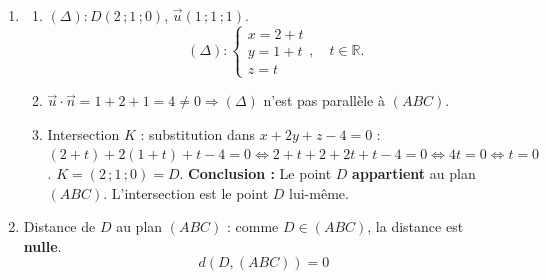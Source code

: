 \documentclass[11pt]{article}
\begin{document}
\begin{corrige}
\begin{enumerate}
\begin{enumerate}
\item Équation cartésienne de $(ABC)$ : $1(x-1) + 2(y-2) + 1(z+1) = 0 \iff x + 2y + z - 4 = 0$.
\[
\boxed{(ABC) : x + 2y + z - 4 = 0}
\]
\end{enumerate}
\item \begin{enumerate}
\item $(\Delta) : D(2\,;1\,;0)$, $\vec{u}(1\,;1\,;1)$.
\[
(\Delta) : \begin{cases} x = 2 + t \\ y = 1 + t \\ z = t \end{cases},\quad t\in\mathbb{R}.
\]
\item $\vec{u}\cdot\vec{n} = 1 + 2 + 1 = 4 \neq 0 \Rightarrow (\Delta)$ n'est pas parallèle à $(ABC)$.
\item Intersection $K$ : substitution dans $x+2y+z-4=0$ :
$(2+t) + 2(1+t) + t - 4 = 0 \iff 2+t+2+2t+t-4=0 \iff 4t=0 \iff t=0$.
$K = (2\,;1\,;0) = D$.
\textbf{Conclusion :} Le point $D$ \textbf{appartient} au plan $(ABC)$. L'intersection est le point $D$ lui-même.
\end{enumerate}
\item Distance de $D$ au plan $(ABC)$ : comme $D\in(ABC)$, la distance est \textbf{nulle}.
\[
\boxed{d(D,(ABC)) = 0}
\]
\end{enumerate}
\end{corrige}
\end{document}
